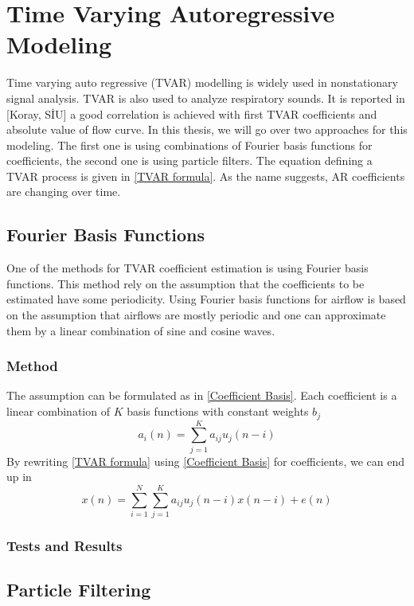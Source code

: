 \documentclass[a4paper,onesided,12pt]{report}
\begin{document}
\section{Time Varying Autoregressive Modeling}
Time varying auto regressive (TVAR) modelling is widely used in nonstationary signal analysis. TVAR is also used to analyze respiratory sounds. It is reported in [Koray, SİU] a good correlation is achieved with first TVAR coefficients and absolute value of flow curve. In this thesis, we will go over two approaches for this modeling. The first one is using combinations of Fourier basis functions for coefficients, the second one is using particle filters.  
The equation defining a TVAR process is given in \eqref{TVAR formula}. As the name suggests, AR coefficients are changing over time.

\subsection{Fourier Basis Functions}
One of the methods for TVAR coefficient estimation is using Fourier basis functions. This method rely on the assumption that the coefficients to be estimated have some periodicity. 
Using Fourier basis functions for airflow is based on the assumption that airflows are mostly periodic and one can approximate them by a linear combination of sine and cosine waves.
\subsubsection{Method}
The assumption can be formulated as in \eqref{Coefficient Basis}. Each coefficient is a linear combination of $K$ basis functions with constant weights $b_j$
\begin{equation}\label{Coefficient Basis}
a_{i}(n) = \sum_{j=1}^{K}{a_{ij}u_{j}(n-i)}
\end{equation}
By rewriting \eqref{TVAR formula} using \eqref{Coefficient Basis} for coefficients, we can end up in 
\begin{equation}\label{TVAR formula_2}
x(n) = \sum_{i=1}^{N}\sum_{j=1}^{K}{a_{ij}u_j(n-i)x(n-i)} + e(n) 
\end{equation}

\subsubsection{Tests and Results}

\subsection{Particle Filtering}
\end{document}
